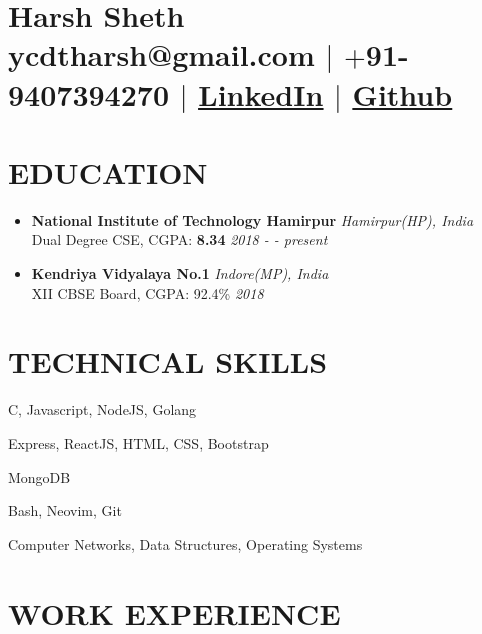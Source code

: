 \documentclass[11pt]{article}
\begin{document}
\section{\Huge{Harsh Sheth}\\ \large \normalfont ycdtharsh@gmail.com $|$ \normalfont $+$91-9407394270 $|$  \underline{\href{https://www.linkedin.com/in/harsh-sheth-2101}{LinkedIn}} $|$ \underline{\href{https://github.com/harsh-sheth}{Github}}}

\section{EDUCATION}
\begin{itemize}
  \item{
      \textbf{National Institute of Technology Hamirpur} \hfill \textit{Hamirpur(HP), India}\\
      Dual Degree CSE, CGPA: \textbf{8.34} \hfill \textit{2018 - - present}
  } 
  \item{
      \textbf{Kendriya Vidyalaya No.1} \hfill \textit{Indore(MP), India}\\
      XII CBSE Board, CGPA: 92.4\% \hfill \textit{2018}
  }
\end{itemize}

\section{TECHNICAL SKILLS}
\begin{description}
  \setlength{\itemindent}{\parindent}
  \setlength{\itemsep}{0em}
  \item[Languages:]{C, Javascript, NodeJS, Golang}
  \item[Web Technologies:]{Express, ReactJS, HTML, CSS, Bootstrap}
  \item[Database:]{MongoDB}
  \item[Tools:]{Bash, Neovim, Git}
  \item[Coursework:]{Computer Networks, Data Structures,  Operating Systems}
\end{description}

\section{WORK EXPERIENCE}
\end{document}
